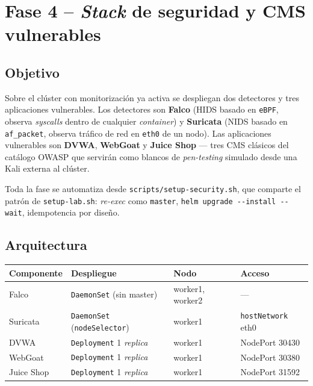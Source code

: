 \section{Fase 4 -- \emph{Stack} de seguridad y CMS vulnerables}

\subsection{Objetivo}

Sobre el clúster con monitorización ya activa se despliegan dos detectores y tres aplicaciones vulnerables. Los detectores son \textbf{Falco} (HIDS basado en \texttt{eBPF}, observa \emph{syscalls} dentro de cualquier \emph{container}) y \textbf{Suricata} (NIDS basado en \texttt{af\_packet}, observa tráfico de red en \texttt{eth0} de un nodo). Las aplicaciones vulnerables son \textbf{DVWA}, \textbf{WebGoat} y \textbf{Juice Shop} --- tres CMS clásicos del catálogo OWASP que servirán como blancos de \emph{pen-testing} simulado desde una Kali externa al clúster.

Toda la fase se automatiza desde \texttt{scripts/setup-security.sh}, que comparte el patrón de \texttt{setup-lab.sh}: \emph{re-exec} como \texttt{master}, \texttt{helm upgrade -{}-install -{}-wait}, idempotencia por diseño.

\subsection{Arquitectura}

\begin{center}
\begin{tabular}{|l|l|l|l|}
\hline
\textbf{Componente} & \textbf{Despliegue} & \textbf{Nodo} & \textbf{Acceso} \\
\hline
Falco       & \texttt{DaemonSet} (sin master)         & worker1, worker2 & --- \\
Suricata    & \texttt{DaemonSet} (\texttt{nodeSelector}) & worker1       & \texttt{hostNetwork} eth0 \\
DVWA        & \texttt{Deployment} 1 \emph{replica}    & worker1          & NodePort 30430 \\
WebGoat     & \texttt{Deployment} 1 \emph{replica}    & worker1          & NodePort 30380 \\
Juice Shop  & \texttt{Deployment} 1 \emph{replica}    & worker1          & NodePort 31592 \\
\hline
\end{tabular}
\end{center}

